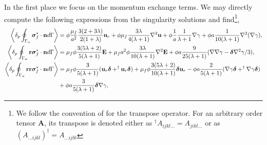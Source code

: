 In the first place we focus on the momentum exchange terms. 
We may directly compute the following expressions from the singularity solutions and find\footnote{
    We follow the convention of \citet{happel2012low} for the transpose operator.
    For an arbitrary order tensor \textbf{A}, its transpose is denoted either as $^\dagger A_{ijkl\ldots} = A_{jikl\ldots}$ or as $ (A_{\ldots ijkl})^\dagger = A_{\ldots ijlk}$}, 
\begin{align}
    \pSavg{\bm\sigma_f^*\cdot \textbf{n}} &
    =
    \phi
    \frac{\mu_f}{a^2}
    \frac{3(2+3\lambda)}{2(1+\lambda)}\textbf{u}_r
    + \phi\mu_f  \frac{3\lambda}{4(\lambda +1)} \grad^2 \textbf{u}%
    + \phi \frac{1}{a}\frac{1}{\lambda +1} \grad \gamma
    + \phi a \frac{1}{10(\lambda +1)}\grad^2(\grad\gamma),
    \label{eq:drag_forces}
    \\
    \pSavg{\textbf{r}\bm\sigma_f^*\cdot \textbf{n}} &
    = \mu_f \phi 
    \frac{3(5\lambda +2)}{5(\lambda +1)}\textbf{E}
    + \mu_f a^2 \phi \frac{3\lambda}{10(\lambda+1)}\grad^2  \textbf{E}
    + \phi a \frac{9}{25(\lambda +1)}(\grad\grad \gamma- \bm\delta\grad^2 \gamma/3),
    \label{eq:first_mom}
    \\
    \pSavg{\textbf{rr}\bm\sigma_f^*\cdot \textbf{n}} &
    =
    \mu_f \phi \frac{3}{5(\lambda +1)} (\textbf{u}_r \bm\delta + ^\dagger\textbf{u}_r\bm\delta )
    + \mu_f \phi \frac{3(5\lambda +2)}{10(\lambda+1)}\bm\delta \textbf{u}_r
    - \phi a\frac{2}{5(\lambda+1)}(\grad \gamma \bm\delta+  ^\dagger \grad \gamma\bm\delta)
    \nonumber\\&
    + \phi a\frac{3}{5(\lambda+1)} \bm\delta \grad \gamma,
    \label{eq:second_mom1}
\end{align}
